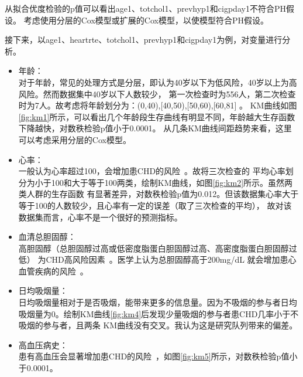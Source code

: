 \documentclass[lang=cn,11pt,a4paper,cite=super,AutoFakeBold]{elegantpaper}
\begin{document}
从拟合优度检验的p值可以看出age1、totchol1、prevhyp1和cigpday1不符合PH假设。
考虑使用分层的Cox模型或扩展的Cox模型，以使模型符合PH假设。

接下来，以age1、heartrte、totchol1、prevhyp1和cigpday1为例，对变量进行分析。
\begin{itemize}
   \item \label{item:age} 年龄：\\
   对于年龄，常见的处理方式是分层，即认为40岁以下为低风险，40岁以上为高风险。然而数据集中40岁以下人数较少，
   第一次检查时为556人，第二次检查时为7人。故考虑将年龄划分为：(0,40),[40,50),[50,60),[60,81] 。
   KM曲线如图\ref{fig:km1}所示，可以看出几个年龄段生存曲线有明显不同，年龄越大生存函数下降越快，对数秩检验p值小于0.0001。
   从几条KM曲线间距趋势来看，这里可以考虑采用分层的Cox模型。
   
   \item 心率：\\一般认为心率超过100，会增加患CHD的风险~\cite{2blood}。故将三次检查的
   平均心率划分为小于100和大于等于100两类，绘制KM曲线，如图\ref{fig:km2}所示。虽然两类人群的生存函数
   有显著差异，对数秩检验p值为0.012。但该数据集心率大于等于100的人数较少，且心率有一定的误差（取了三次检查的平均），
   故对该数据集而言，心率不是一个很好的预测指标。

   \item 血清总胆固醇：\\高胆固醇（总胆固醇过高或低密度脂蛋白胆固醇过高、高密度脂蛋白胆固醇过低）
   为CHD高风险因素~\cite{3blood}。医学上认为总胆固醇高于200mg/dL 就会增加患心血管疾病的风险~\cite{chol}。

   \item 日均吸烟量：\\日均吸烟量相对于是否吸烟，能带来更多的信息量。因为不吸烟的参与者日均
   吸烟量为0。绘制KM曲线\ref{fig:km4}后发现少量吸烟的参与者患CHD几率小于不吸烟的参与者，且两条
   KM曲线没有交叉。我认为这是研究队列带来的偏差。

   \item 高血压病史：\\患有高血压会显著增加患CHD的风险~\cite{2blood}，如图\ref{fig:km5}所示，对数秩检验p值小于0.0001。
\end{itemize}
\end{document}
